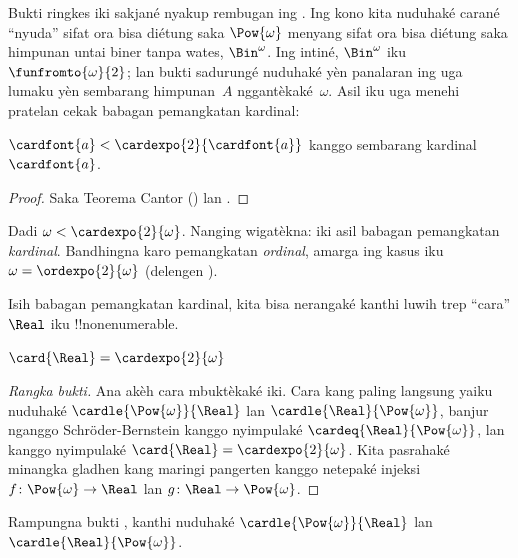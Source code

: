 \documentclass[../../../include/open-logic-section]{subfiles}
\begin{document}
Bukti ringkes iki sakjané nyakup rembugan ing
. Ing kono kita nuduhaké carané
“nyuda” sifat ora bisa diétung saka $\Pow{\omega}$
menyang sifat ora bisa diétung saka himpunan untai biner
tanpa wates, $\Bin^\omega$. Ing intiné, $\Bin^{\omega}$
iku $\funfromto{\omega}{2}$; lan bukti sadurungé nuduhaké
yèn panalaran ing  uga lumaku
yèn sembarang himpunan~$A$ nggantèkaké~$\omega$.
Asil iku uga menehi pratelan cekak babagan pemangkatan
kardinal:

\begin{cor}
$\cardfont{a} < \cardexpo{2}{\cardfont{a}}$ kanggo sembarang kardinal~$\cardfont{a}$.
\end{cor}

\begin{proof}
Saka Teorema Cantor () lan
.
\end{proof}
\noindent
Dadi $\omega < \cardexpo{2}{\omega}$. Nanging wigatèkna:
iki asil babagan pemangkatan \emph{kardinal}. Bandhingna
karo pemangkatan \emph{ordinal}, amarga ing kasus iku
$\omega = \ordexpo{2}{\omega}$
(delengen ).

Isih babagan pemangkatan kardinal, kita bisa nerangaké
kanthi luwih trep “cara” $\Real$ iku
!!{nonenumerable}.

\begin{thm}
$\card{\Real} = \cardexpo{2}{\omega}$
\end{thm}

\begin{proof}[Rangka bukti]
Ana akèh cara mbuktèkaké iki. Cara kang paling langsung
yaiku nuduhaké $\cardle{\Pow{\omega}}{\Real}$ lan
$\cardle{\Real}{\Pow{\omega}}$, banjur nganggo
Schr\"oder-Bernstein kanggo nyimpulaké
$\cardeq{\Real}{\Pow{\omega}}$, lan
 kanggo
nyimpulaké $\card{\Real} = \cardexpo{2}{\omega}$.
Kita pasrahaké minangka gladhen kang maringi pangerten
kanggo netepaké injeksi $f \colon
\Pow{\omega} \to \Real$ lan $g \colon \Real \to \Pow{\omega}$.
\end{proof}

\begin{prob}
Rampungna bukti
, kanthi
nuduhaké $\cardle{\Pow{\omega}}{\Real}$ lan
$\cardle{\Real}{\Pow{\omega}}$.
\end{prob}
\end{document}
